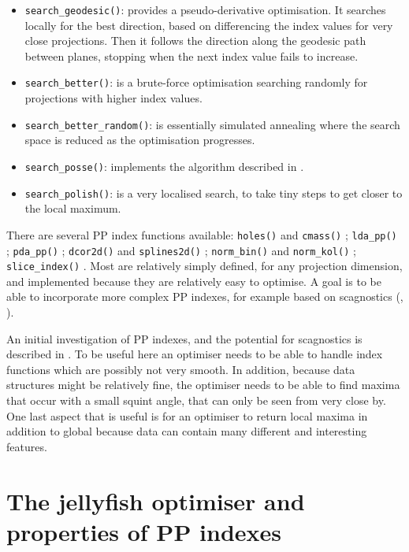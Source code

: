 \documentclass[
  number,
  preprint,
  3p]{elsarticle}
\providecommand{\tightlist}{%
  \setlength{\itemsep}{0pt}\setlength{\parskip}{0pt}}\usepackage{longtable,booktabs,array}
\begin{document}
\begin{itemize}
\tightlist
\item
  \texttt{search\_geodesic()}: provides a pseudo-derivative
  optimisation. It searches locally for the best direction, based on
  differencing the index values for very close projections. Then it
  follows the direction along the geodesic path between planes, stopping
  when the next index value fails to increase.
\item
  \texttt{search\_better()}: is a brute-force optimisation searching
  randomly for projections with higher index values.
\item
  \texttt{search\_better\_random()}: is essentially simulated annealing
  \citep{Bertsimas93} where the search space is reduced as the
  optimisation progresses.
\item
  \texttt{search\_posse()}: implements the algorithm described in
  \citet{posse95}.
\item
  \texttt{search\_polish()}: is a very localised search, to take tiny
  steps to get closer to the local maximum.
\end{itemize}

There are several PP index functions available: \texttt{holes()} and
\texttt{cmass()} \citep{cook1993projection}; \texttt{lda\_pp()}
\citep{lee2005projection}; \texttt{pda\_pp()} \citep{lee2010projection};
\texttt{dcor2d()} and \texttt{splines2d()} \citep{Grimm2016};
\texttt{norm\_bin()} and \texttt{norm\_kol()} \citep{huber85};
\texttt{slice\_index()} \citep{Laa:2020wkm}. Most are relatively simply
defined, for any projection dimension, and implemented because they are
relatively easy to optimise. A goal is to be able to incorporate more
complex PP indexes, for example based on scagnostics (\citet{scag},
\citet{WW08}).

An initial investigation of PP indexes, and the potential for
scagnostics is described in \citet{laa_using_2020}. To be useful here an
optimiser needs to be able to handle index functions which are possibly
not very smooth. In addition, because data structures might be
relatively fine, the optimiser needs to be able to find maxima that
occur with a small squint angle, that can only be seen from very close
by. One last aspect that is useful is for an optimiser to return local
maxima in addition to global because data can contain many different and
interesting features.

\section{The jellyfish optimiser and properties of PP
indexes}\label{sec-theory}
\end{document}
